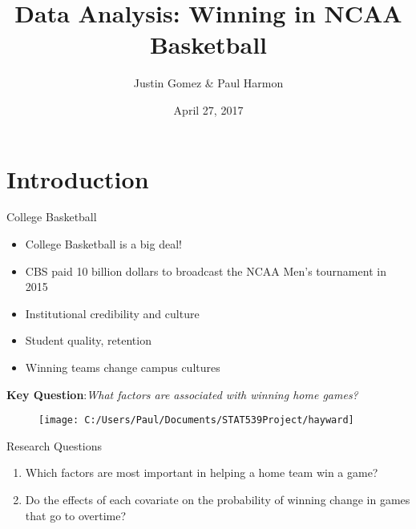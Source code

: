 \documentclass{beamer}
\title[NCAA Basketball]{Data Analysis: Winning in NCAA Basketball}
\author{Justin Gomez \& Paul Harmon}
\date{April 27, 2017}
\begin{document}
	
	\begin{frame}
		\titlepage
	\end{frame}
	

	\section{Introduction}
	
	\begin{frame}{College Basketball}
	\begin{multicols}{2}
		\begin{itemize}
		\item College Basketball is a big deal! 
		\item CBS paid 10 billion dollars to broadcast the NCAA Men's tournament in 2015 
		\item Institutional credibility and culture 
		\item Student quality, retention
		\item Winning teams change campus cultures
				
		
	\end{itemize}
\textbf{Key Question}:\textit{What factors are associated with winning home games? }
	\begin{figure}[r]
		\texttt{[image: C:/Users/Paul/Documents/STAT539Project/hayward]}
	\end{figure}
\end{multicols}
	
	\end{frame}

\begin{frame}{Research Questions}
\begin{enumerate}
	\item %
	Which factors are most important in helping a home team win a game?
	\item %
	Do the effects of each covariate on the probability of winning change in games that go to overtime?
\end{enumerate}
	
\end{frame}

	
\end{document}
